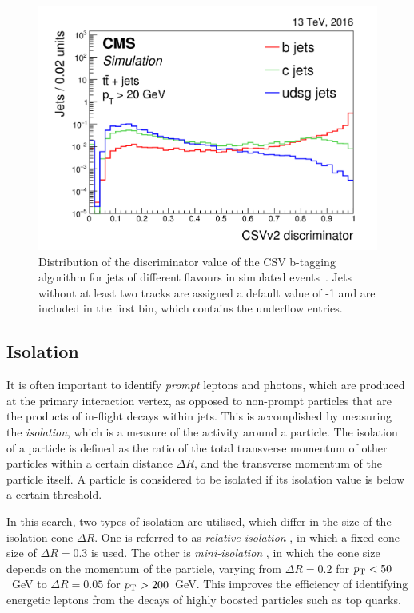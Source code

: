 \begin{figure}
\begin{center}
\includegraphics[width=0.8\linewidth]{figs/detector/btagcsv}
\end{center}
\caption{Distribution of the discriminator value of the CSV b-tagging algorithm 
for jets of different flavours in simulated \ttbar events~\cite{btagging}. Jets 
without at least two tracks are assigned a default value of -1 and are included 
in the first bin, which contains the underflow entries.}
\label{fig:btagcsv}
\end{figure}

\subsection{Isolation}%
\label{sec:detector-isolation}
It is often important to identify \textit{prompt} leptons and photons, which 
are produced at the primary interaction vertex, as opposed to non-prompt 
particles that are the products of in-flight decays within jets. 
This is 
accomplished by measuring the \textit{isolation}, which is a measure of the 
activity around a particle. The isolation of a particle is defined as the ratio 
of the total transverse momentum of other particles within a certain distance 
$\Delta R$, and the transverse momentum of the particle itself. A particle is 
considered to be isolated if its isolation value is below a certain threshold.

In this search, two types of isolation are utilised, which differ in the size 
of the isolation cone $\Delta R$. One is referred to as \textit{relative 
isolation} \reliso, in which a fixed cone size of $\Delta R = 0.3$ is used. The 
other is \textit{mini-isolation} \miniiso, in which the cone size depends on 
the momentum of the particle, varying from $\Delta R = 0.2$ for ${p_{\text T}} < 50$~GeV 
to $\Delta R = 0.05$ for ${p_{\text T}} > 200$~GeV. This improves the efficiency of 
identifying energetic leptons from the decays of highly boosted particles such 
as top quarks. 

